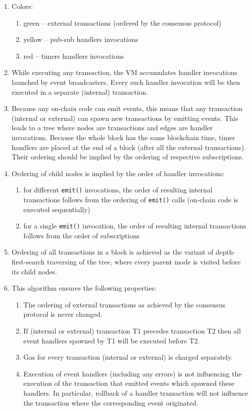 \documentclass[a4paper]{article}
\newcommand{\code}[1]{{\small \texttt{#1}}}
\begin{document}
\begin{enumerate}
\item Colors:
  \begin{enumerate}
  \item green -- external transactions (ordered by the consensus protocol)
  \item yellow -- pub-sub handlers invocations
  \item red -- timers handlers invocations
  \end{enumerate}
\item While executing any transaction, the VM accumulates handler invocations launched by event broadcasters. Every such handler invocation will be then executed in a separate (internal) transaction.
\item Because any on-chain code can emit events, this means that any transaction (internal or external) can spawn new transactions by emitting events. This leads to a tree where nodes are transactions and edges are handler invocations. Because the whole block has the same blockchain time, timer handlers are placed at the end of a block (after all the external transactions). Their ordering should be implied by the ordering of respective subscriptions.
\item Ordering of child nodes is implied by the order of handler invocations:
  \begin{enumerate}
  \item for different \code{emit()} invocations, the order of resulting internal transactions follows from the ordering of \code{emit()} calls (on-chain code is executed sequentially)
  \item for a single \code{emit()} invocation, the order of resulting internal transactions follows from the order of subscriptions
  \end{enumerate}
\item Ordering of all transactions in a block is achieved as the variant of depth-first-search traversing of the tree, where every parent mode is visited before its child nodes.
\item This algorithm ensures the following properties:
  \begin{enumerate}
  \item The ordering of external transactions as achieved by the consensus protocol is never changed.
  \item If (internal or external) transaction T1 precedes transaction T2 then all event handlers spawned by T1 will be executed before T2.
  \item Gas for every transaction (internal or external) is charged separately.
  \item Execution of event handlers (including any errors) is not influencing the execution of the transaction that emitted events which spawned these handlers. In particular, rollback of a handler transaction will not influence the transaction where the corresponding event originated.    
  \end{enumerate}
\end{enumerate}
\end{document}
